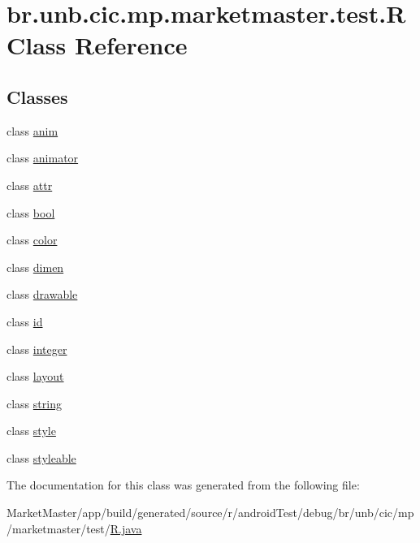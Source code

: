 \hypertarget{classbr_1_1unb_1_1cic_1_1mp_1_1marketmaster_1_1test_1_1R}{}\section{br.\+unb.\+cic.\+mp.\+marketmaster.\+test.\+R Class Reference}
\label{classbr_1_1unb_1_1cic_1_1mp_1_1marketmaster_1_1test_1_1R}
\subsection*{Classes}
\begin{DoxyCompactItemize}
\item 
class \mbox{\hyperlink{classbr_1_1unb_1_1cic_1_1mp_1_1marketmaster_1_1test_1_1R_1_1anim}{anim}}
\item 
class \mbox{\hyperlink{classbr_1_1unb_1_1cic_1_1mp_1_1marketmaster_1_1test_1_1R_1_1animator}{animator}}
\item 
class \mbox{\hyperlink{classbr_1_1unb_1_1cic_1_1mp_1_1marketmaster_1_1test_1_1R_1_1attr}{attr}}
\item 
class \mbox{\hyperlink{classbr_1_1unb_1_1cic_1_1mp_1_1marketmaster_1_1test_1_1R_1_1bool}{bool}}
\item 
class \mbox{\hyperlink{classbr_1_1unb_1_1cic_1_1mp_1_1marketmaster_1_1test_1_1R_1_1color}{color}}
\item 
class \mbox{\hyperlink{classbr_1_1unb_1_1cic_1_1mp_1_1marketmaster_1_1test_1_1R_1_1dimen}{dimen}}
\item 
class \mbox{\hyperlink{classbr_1_1unb_1_1cic_1_1mp_1_1marketmaster_1_1test_1_1R_1_1drawable}{drawable}}
\item 
class \mbox{\hyperlink{classbr_1_1unb_1_1cic_1_1mp_1_1marketmaster_1_1test_1_1R_1_1id}{id}}
\item 
class \mbox{\hyperlink{classbr_1_1unb_1_1cic_1_1mp_1_1marketmaster_1_1test_1_1R_1_1integer}{integer}}
\item 
class \mbox{\hyperlink{classbr_1_1unb_1_1cic_1_1mp_1_1marketmaster_1_1test_1_1R_1_1layout}{layout}}
\item 
class \mbox{\hyperlink{classbr_1_1unb_1_1cic_1_1mp_1_1marketmaster_1_1test_1_1R_1_1string}{string}}
\item 
class \mbox{\hyperlink{classbr_1_1unb_1_1cic_1_1mp_1_1marketmaster_1_1test_1_1R_1_1style}{style}}
\item 
class \mbox{\hyperlink{classbr_1_1unb_1_1cic_1_1mp_1_1marketmaster_1_1test_1_1R_1_1styleable}{styleable}}
\end{DoxyCompactItemize}


The documentation for this class was generated from the following file\+:\begin{DoxyCompactItemize}
\item 
Market\+Master/app/build/generated/source/r/android\+Test/debug/br/unb/cic/mp/marketmaster/test/\mbox{\hyperlink{androidTest_2debug_2br_2unb_2cic_2mp_2marketmaster_2test_2R_8java}{R.\+java}}\end{DoxyCompactItemize}
